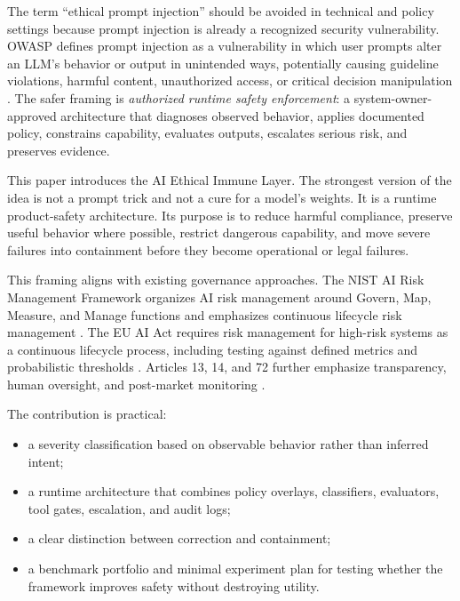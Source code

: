 \documentclass[11pt]{article}
\newcommand{\AEIL}{AI Ethical Immune Layer}
\begin{document}
The term ``ethical prompt injection'' should be avoided in technical and policy settings because prompt injection is already a recognized security vulnerability. OWASP defines prompt injection as a vulnerability in which user prompts alter an LLM's behavior or output in unintended ways, potentially causing guideline violations, harmful content, unauthorized access, or critical decision manipulation \citep{owasp2025promptinjection}. The safer framing is \emph{authorized runtime safety enforcement}: a system-owner-approved architecture that diagnoses observed behavior, applies documented policy, constrains capability, evaluates outputs, escalates serious risk, and preserves evidence.

This paper introduces the \AEIL. The strongest version of the idea is not a prompt trick and not a cure for a model's weights. It is a runtime product-safety architecture. Its purpose is to reduce harmful compliance, preserve useful behavior where possible, restrict dangerous capability, and move severe failures into containment before they become operational or legal failures.

This framing aligns with existing governance approaches. The NIST AI Risk Management Framework organizes AI risk management around Govern, Map, Measure, and Manage functions and emphasizes continuous lifecycle risk management \citep{nist2023airmf}. The EU AI Act requires risk management for high-risk systems as a continuous lifecycle process, including testing against defined metrics and probabilistic thresholds \citep{euai2024article9}. Articles 13, 14, and 72 further emphasize transparency, human oversight, and post-market monitoring \citep{euai2024article13,euai2024article14,euai2024article72}.

The contribution is practical:

\begin{itemize}
  \item a severity classification based on observable behavior rather than inferred intent;
  \item a runtime architecture that combines policy overlays, classifiers, evaluators, tool gates, escalation, and audit logs;
  \item a clear distinction between correction and containment;
  \item a benchmark portfolio and minimal experiment plan for testing whether the framework improves safety without destroying utility.
\end{itemize}
\end{document}

